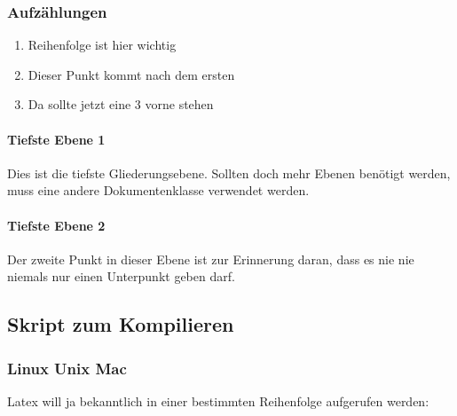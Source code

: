 \subsubsection{Aufzählungen}
\begin{enumerate}
\item Reihenfolge ist hier wichtig
\item Dieser Punkt kommt nach dem ersten
\item Da sollte jetzt eine 3 vorne stehen
\end{enumerate}

\paragraph{Tiefste Ebene 1}
Dies ist die tiefste Gliederungsebene. Sollten doch mehr Ebenen benötigt werden, muss eine andere Dokumentenklasse verwendet werden.

\paragraph{Tiefste Ebene 2}
Der zweite Punkt in dieser Ebene ist zur Erinnerung daran, dass es nie nie niemals nur einen Unterpunkt geben darf.


\subsection{Skript zum Kompilieren}
\subsubsection{Linux Unix Mac}
Latex will ja bekanntlich in einer bestimmten Reihenfolge aufgerufen werden:

